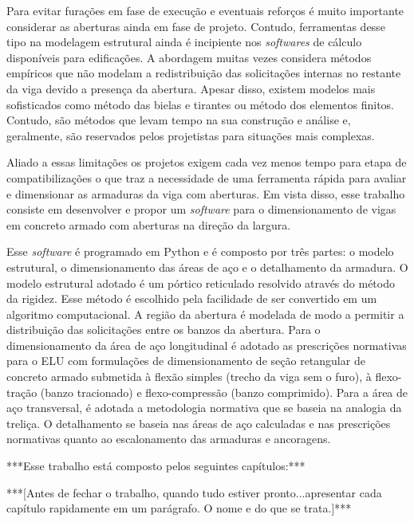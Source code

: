 Para evitar furações em fase de execução e eventuais reforços é muito importante considerar as aberturas ainda em fase de projeto. Contudo, ferramentas desse tipo na modelagem estrutural ainda é incipiente nos \textit{softwares} de cálculo disponíveis para edificações. A abordagem muitas vezes considera métodos empíricos que não modelam a redistribuição das solicitações internas no restante da viga devido a presença da abertura. Apesar disso, existem  modelos mais sofisticados como método das bielas e tirantes ou método dos elementos finitos. Contudo, são métodos que levam tempo na sua construção e análise e, geralmente, são reservados pelos projetistas para situações mais complexas.

Aliado a essas limitações os projetos exigem cada vez menos tempo para etapa de compatibilizações o que traz a necessidade de uma ferramenta rápida para avaliar e dimensionar as armaduras da viga com aberturas. Em vista disso, esse trabalho consiste em desenvolver e propor um \textit{software} para o dimensionamento de vigas em concreto armado com aberturas na direção da largura.

Esse \textit{software} é programado em Python e é composto por três partes: o modelo estrutural, o dimensionamento das áreas de aço e o detalhamento da armadura. O modelo estrutural adotado é um pórtico reticulado resolvido através do método da rigidez. Esse método é escolhido pela facilidade de ser convertido em um algoritmo computacional. A região da abertura é modelada de modo a permitir a distribuição das solicitações entre os banzos da abertura. Para o dimensionamento da área de aço longitudinal é adotado as prescrições normativas para o ELU com formulações de dimensionamento de seção retangular de concreto armado submetida à flexão simples (trecho da viga sem o furo), à flexo-tração (banzo tracionado) e flexo-compressão (banzo comprimido). Para a área de aço transversal, é adotada a metodologia normativa que se baseia na analogia da treliça. O detalhamento se baseia nas áreas de aço calculadas e nas prescrições normativas quanto ao escalonamento das armaduras e ancoragens.

***Esse trabalho está composto pelos seguintes capítulos:***

***[Antes de fechar o trabalho, quando tudo estiver pronto...apresentar cada capítulo rapidamente em um parágrafo. O nome e do que se trata.]***